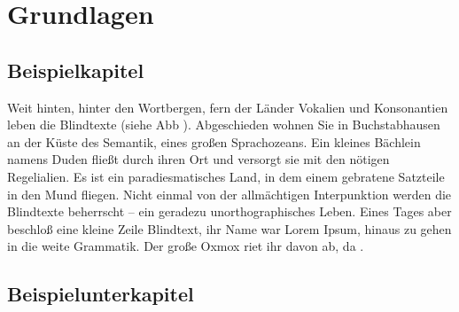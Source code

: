 \chapter{Grundlagen}
\label{sec:grundlagen}


\section{Beispielkapitel}
\label{sec:beispiel}

Weit hinten, hinter den Wortbergen, fern der Länder Vokalien und Konsonantien leben die Blindtexte (siehe Abb ). Abgeschieden wohnen Sie in Buchstabhausen an der Küste des Semantik, eines großen Sprachozeans. Ein kleines Bächlein namens Duden fließt durch ihren Ort und versorgt sie mit den nötigen Regelialien. Es ist ein paradiesmatisches Land, in dem einem gebratene Satzteile in den Mund fliegen. Nicht einmal von der allmächtigen Interpunktion werden die Blindtexte beherrscht – ein geradezu unorthographisches Leben. Eines Tages aber beschloß eine kleine Zeile Blindtext, ihr Name war Lorem Ipsum, hinaus zu gehen in die weite Grammatik. Der große Oxmox riet ihr davon ab, da \cite{test}.

\section{Beispielunterkapitel}
\label{subsec:beispiel}
